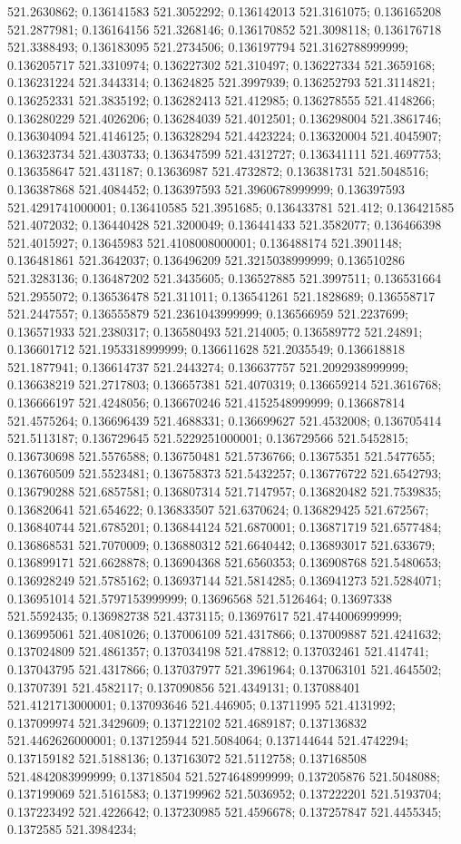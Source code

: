 521.2630862; 0.136141583 521.3052292; 0.136142013 521.3161075; 0.136165208 521.2877981; 0.136164156 521.3268146; 0.136170852 521.3098118; 0.136176718 521.3388493; 0.136183095 521.2734506; 0.136197794 521.3162788999999; 0.136205717 521.3310974; 0.136227302 521.310497; 0.136227334 521.3659168; 0.136231224 521.3443314; 0.13624825 521.3997939; 0.136252793 521.3114821; 0.136252331 521.3835192; 0.136282413 521.412985; 0.136278555 521.4148266; 0.136280229 521.4026206; 0.136284039 521.4012501; 0.136298004 521.3861746; 0.136304094 521.4146125; 0.136328294 521.4423224; 0.136320004 521.4045907; 0.136323734 521.4303733; 0.136347599 521.4312727; 0.136341111 521.4697753; 0.136358647 521.431187; 0.13636987 521.4732872; 0.136381731 521.5048516; 0.136387868 521.4084452; 0.136397593 521.3960678999999; 0.136397593 521.4291741000001; 0.136410585 521.3951685; 0.136433781 521.412; 0.136421585 521.4072032; 0.136440428 521.3200049; 0.136441433 521.3582077; 0.136466398 521.4015927; 0.13645983 521.4108008000001; 0.136488174 521.3901148; 0.136481861 521.3642037; 0.136496209 521.3215038999999; 0.136510286 521.3283136; 0.136487202 521.3435605; 0.136527885 521.3997511; 0.136531664 521.2955072; 0.136536478 521.311011; 0.136541261 521.1828689; 0.136558717 521.2447557; 0.136555879 521.2361043999999; 0.136566959 521.2237699; 0.136571933 521.2380317; 0.136580493 521.214005; 0.136589772 521.24891; 0.136601712 521.1953318999999; 0.136611628 521.2035549; 0.136618818 521.1877941; 0.136614737 521.2443274; 0.136637757 521.2092938999999; 0.136638219 521.2717803; 0.136657381 521.4070319; 0.136659214 521.3616768; 0.136666197 521.4248056; 0.136670246 521.4152548999999; 0.136687814 521.4575264; 0.136696439 521.4688331; 0.136699627 521.4532008; 0.136705414 521.5113187; 0.136729645 521.5229251000001; 0.136729566 521.5452815; 0.136730698 521.5576588; 0.136750481 521.5736766; 0.13675351 521.5477655; 0.136760509 521.5523481; 0.136758373 521.5432257; 0.136776722 521.6542793; 0.136790288 521.6857581; 0.136807314 521.7147957; 0.136820482 521.7539835; 0.136820641 521.654622; 0.136833507 521.6370624; 0.136829425 521.672567; 0.136840744 521.6785201; 0.136844124 521.6870001; 0.136871719 521.6577484; 0.136868531 521.7070009; 0.136880312 521.6640442; 0.136893017 521.633679; 0.136899171 521.6628878; 0.136904368 521.6560353; 0.136908768 521.5480653; 0.136928249 521.5785162; 0.136937144 521.5814285; 0.136941273 521.5284071; 0.136951014 521.5797153999999; 0.13696568 521.5126464; 0.13697338 521.5592435; 0.136982738 521.4373115; 0.13697617 521.4744006999999; 0.136995061 521.4081026; 0.137006109 521.4317866; 0.137009887 521.4241632; 0.137024809 521.4861357; 0.137034198 521.478812; 0.137032461 521.414741; 0.137043795 521.4317866; 0.137037977 521.3961964; 0.137063101 521.4645502; 0.13707391 521.4582117; 0.137090856 521.4349131; 0.137088401 521.4121713000001; 0.137093646 521.446905; 0.13711995 521.4131992; 0.137099974 521.3429609; 0.137122102 521.4689187; 0.137136832 521.4462626000001; 0.137125944 521.5084064; 0.137144644 521.4742294; 0.137159182 521.5188136; 0.137163072 521.5112758; 0.137168508 521.4842083999999; 0.13718504 521.5274648999999; 0.137205876 521.5048088; 0.137199069 521.5161583; 0.137199962 521.5036952; 0.137222201 521.5193704; 0.137223492 521.4226642; 0.137230985 521.4596678; 0.137257847 521.4455345; 0.1372585 521.3984234; 